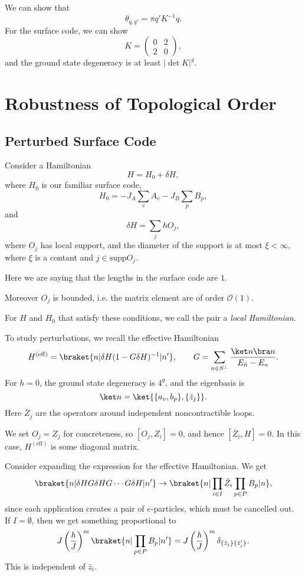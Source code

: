 \documentclass[12pt]{article}
\begin{document}
We can show that
\[
\theta_{q, q'} = \pi q' K^{-1} q.
\]
For the surface code, we can show
\[
K =
\begin{pmatrix}
	0 & 2 \\ 2 & 0
\end{pmatrix},
\]
and the ground state degeneracy is at least $|\!\det K|^{g}$.


\newpage

\section{Robustness of Topological Order}%
\label{sec:rot}

\subsection{Perturbed Surface Code}%
\label{sub:psc}

Consider a Hamiltonian
\[
H = H_0 + \delta H,
\]
where $H_0$ is our familiar surface code,
\[
H_0 =- J_A \sum_{v} A_v - J_B \sum_p B_p,
\]
and
\[
\delta H = \sum_j h O_j,
\]
where $O_j$ has local support, and the diameter of the support is at most $\xi < \infty$, where $\xi$ is a contant and $j \in \mathrm{supp} O_j$.

Here we are saying that the lengths in the surface code are $1$.

Moreover $O_j$ is bounded, i.e. the matrix element are of order $\mathcal{O}(1)$.

For $H$ and $H_0$ that satisfy these conditions, we call the pair a \emph{local Hamiltonian}.

To study perturbations, we recall the effective Hamiltonian
\[
	H^{(\mathrm{eff})} = \braket{n|\delta H(1 - G \delta H)^{-1} | n'}, \qquad G =\sum_{n \in S^{\perp}} \frac{\ket n \bra n}{E_{\tilde n} - E_n}.
\]
For $h = 0$, the ground state degeneracy is $4^{g}$, and the eigenbasis is
\[
	\ket n = \ket{\{a_v, b_p\}, \{\bar z_j\}}.
\]
Here $\bar Z_j$ are the operators around independent noncontractible loops.

We set $O_j = Z_j$ for concreteness, so $[O_j, Z_i] = 0$, and hence $[\bar Z_i, H] = 0$. In this case, $H^{(\mathrm{eff})}$ is some diagonal matrix.

Consider expanding the expression for the effective Hamiltonian. We get
\begin{align*}
	\braket{n | \delta H G \delta H G \cdots G \delta H | n'} \to \braket{n | \prod_{i \in I} \bar Z_i \prod_{p \in P} B_p | n},
\end{align*}
since each application creates a pair of $e$-particles, which must be cancelled out. If $I = \emptyset$, then we get something proportional to
\[
	J \left( \frac hJ\right)^{m} \braket{n| \prod_{p \in P}B_p |n'} = J \left( \frac hJ \right)^{m} \delta_{\{\bar z_j\} \{\bar z_j'\}}.
\]
This is independent of $\bar z_i$.
\end{document}
